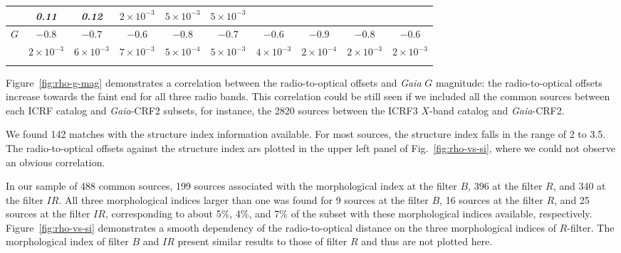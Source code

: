 \documentclass{aa}
\begin{document}
\begin{table}
\begin{tabular}{cccccccccc}
            &\textit{0.11}  &\textit{0.12}  &\textit{$2 \times 10^{-3}$}  &\textit{$5 \times 10^{-3}$}  &\textit{$5 \times 10^{-3}$}  \\
       \hline \noalign{\smallskip}
       $G$  &$-0.8$  &$-0.7$  &$-0.6$  &$-0.8$  &$-0.7$  &$-0.6$  &$-0.9$  &$-0.8$  &$-0.6$  \\
            &\textit{$2 \times 10^{-3}$}  &\textit{$6 \times 10^{-3}$}  &\textit{$7 \times 10^{-3}$}
            &\textit{$5 \times 10^{-4}$}  &\textit{$5 \times 10^{-3}$}  &\textit{$4 \times 10^{-3}$}
            &\textit{$2 \times 10^{-4}$}  &\textit{$2 \times 10^{-3}$}  &\textit{$2 \times 10^{-3}$}  \\
       \hline \noalign{\smallskip}
       \end{tabular}
   \end{table}

%
    Figure~\ref{fig:rho-g-mag} demonstrates a correlation between the radio-to-optical offsets and \textit{Gaia} $G$ magnitude: the radio-to-optical offsets increase towards the faint end for all three radio bands.
    This correlation could be still seen if we included all the common sources between each ICRF catalog and \textit{Gaia}-CRF2 subsets, for instance, the 2820 sources between the ICRF3 $X$-band catalog and \textit{Gaia}-CRF2.

    We found 142 matches with the structure index information available.
    For most sources, the structure index falls in the range of 2 to 3.5.
    The radio-to-optical offsets against the structure index ars plotted in the upper left panel of Fig.~\ref{fig:rho-vs-si}, where we could not observe an obvious correlation.

    In our sample of 488 common sources, 199 sources associated with the morphological index at the filter $B$, 396 at the filter $R$, and 340 at the filter $IR$.
    All three morphological indices larger than one was found for 9 sources at the filter $B$, 16 sources at the filter $R$, and 25 sources at the filter $IR$, corresponding to about 5\%, 4\%, and 7\% of the subset with these morphological indices available, respectively.
    Figure~\ref{fig:rho-vs-si} demonstrates a smooth dependency of the radio-to-optical distance on the three morphological indices of $R$-filter.
    The morphological index of filter $B$ and $IR$ present similar results to those of filter $R$ and thus are not plotted here.
\end{document}

